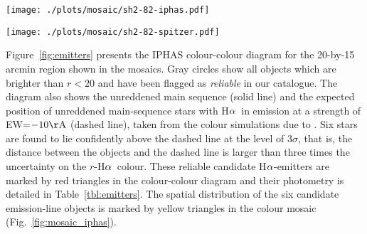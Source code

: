 \documentclass[useAMS,usenatbib]{mn2e}
\def\ha{\mbox{H$\rm \alpha$}}
\def\micron{\mbox{$\mu$m}}
\begin{document}
\begin{figure*}
    \begin{minipage}[b]{0.8\linewidth}
        \texttt{[image: ./plots/mosaic/sh2-82-iphas.pdf]} 
    \end{minipage}
\caption{IPHAS-based mosaic of H{\sc ii} region Sh 2-82,
composed of \ha\ (red channel), $r$ (green channel) and $i$ (blue channel). Yellow triangles show the position of candidate \ha-emitters
which have been selected from the colour-colour diagram
in Figure~\ref{fig:emitters}. Note that the H{\sc ii} region is surrounded by a faint blue/green reflection nebula
and dark cloud filaments.}
\label{fig:mosaic_iphas}
    \begin{minipage}[b]{0.8\linewidth}
        \texttt{[image: ./plots/mosaic/sh2-82-spitzer.pdf]} 
    \end{minipage}
    \caption{Star-forming region Sh 2-82 as seen in the mid-infrared
    by the Spitzer Space Telescope. The mosaic is composed of the 24\,\micron\ (red), 8.0\,\micron\ (green) and 4.5\,\micron\ (blue) bands.
    The image reveals a bubble-shaped structure which surrounds the {\sc Hii} region that is seen in the IPHAS mosaic of the same region (Figure~\ref{fig:mosaic_iphas}).}
    \label{fig:mosaic_spitzer}
\end{figure*}

Figure~\ref{fig:emitters} presents
the IPHAS colour-colour diagram for 
the 20-by-15 arcmin region shown in the mosaics.
Gray circles show all objects
which are brighter than $r<20$
and have been flagged as \emph{reliable}
in our catalogue.
The diagram also shows the unreddened main sequence (solid line)
and the expected position of unreddened main-sequence stars
with \ha\ in emission
at a strength of EW=$-10{\rm \AA}$ (dashed line),
taken from the colour simulations due to \citet{Barentsen2011a}.
Six stars are found to lie confidently above the 
dashed line at the level of $3\sigma$,
that is, the distance between the objects and the dashed line
is larger than three times the uncertainty on the $r$-\ha\ colour.
These reliable candidate \ha-emitters
are marked by red triangles in the colour-colour diagram
and their photometry is detailed in Table~\ref{tbl:emitters}.
The spatial distribution of the six candidate emission-line objects
is marked by yellow triangles in the colour mosaic (Fig.~\ref{fig:mosaic_iphas}).
\end{document}
